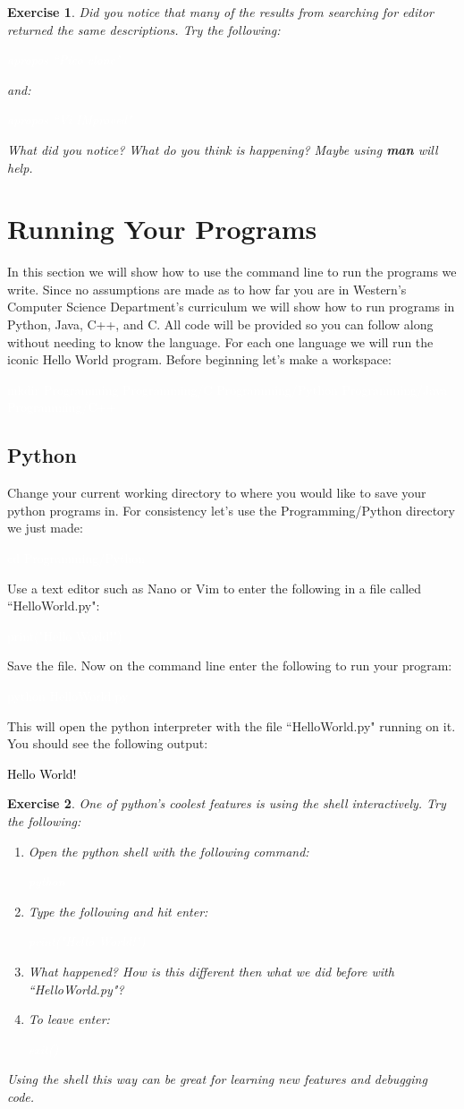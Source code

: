 \documentclass{book}
\newcommand{\commandline}[1]{\begin{center} \colorbox{Dark}{\textcolor{white}{#1}} \end{center}}
\newcommand{\exampleout}[1]{\begin{center} \colorbox{Light}{\textcolor{black}{#1}} \end{center}}
\newtheorem{ex}{Exercise}[chapter]
\begin{document}
\begin{ex}
Did you notice that many of the results from searching for editor returned the same descriptions. Try the following:
\commandline{apropos ``Pico clone"}
and:
\commandline{apropos ``Vi IMproved"}
What did you notice? What do you think is happening? Maybe using \textbf{man} will help.
\end{ex}

\section{Running Your Programs}
In this section we will show how to use the command line to run the programs we write. Since no assumptions are made as to how far you are in Western's Computer Science Department's curriculum we will show how to run programs in Python, Java, C++, and C. All code will be provided so you can follow along without needing to know the language. For each one language we will run the iconic Hello World program. Before beginning let's make a workspace: 
\commandline{mkdir Programming Programming/C Programming/Python Programming/Java Programming/C++}
\subsection{Python}
Change your current working directory to where you would like to save your python programs in. For consistency let's use the Programming/Python directory we just made:
\commandline{cd Programming/Python}
Use a text editor such as Nano or Vim to enter the following in a file called ``HelloWorld.py":
\commandline{print("Hello World!")}
Save the file. Now on the command line enter the following to run your program:
\commandline{python HelloWorld.py}
This will open the python interpreter with the file ``HelloWorld.py" running on it. You should see the following output:
\exampleout{Hello World!}
\begin{ex}
    One of python's coolest features is using the shell interactively. Try the following:
    \begin{enumerate}
        \item Open the python shell with the following command:
            \commandline{python}
        \item Type the following and hit enter:
            \commandline{print("Hello World!")}
        \item What happened? How is this different then what we did before with ``HelloWorld.py"?
        \item To leave enter:
            \commandline{exit()}
    \end{enumerate}
    Using the shell this way can be great for learning new features and debugging code.
\end{ex}
\end{document}
